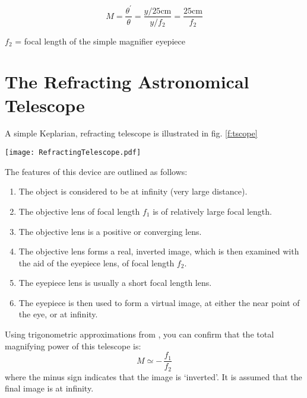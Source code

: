 \begin{equation}\label{e:mag}
	M =\frac{\theta^{\prime}}{\theta}=\frac{y/25\textrm{cm}}{y/f_{2}}=\frac{25\textrm{cm}}{f_{2}}
\end{equation}


$f_2$ = focal length of the simple magnifier eyepiece


\section{The Refracting Astronomical Telescope}
A simple Keplarian, refracting telescope is illustrated in fig. \ref{f:tscope}

\begin{figure*}
  \hfill
  \texttt{[image: RefractingTelescope.pdf]}
  \caption[Keplerian Refracting Telescope]{\textsc{Refracting telescope} with the the object and image projected over each other on the left.  The main lens has a focal length of $f_{1}$ while the eyepiece has a focal length of $f_{2}$}
  \label{f:tscope}
  \forceversofloat
\end{figure*}

The features of this device are outlined as follows:
\begin{enumerate}
	\item The object is considered to be at infinity (very large distance). 
	\item The objective lens of focal length $f_1$ is of relatively large focal length.	
	\item The objective lens is a positive or converging lens.
	\item The objective lens forms a real, inverted image, which is then examined with the aid of the eyepiece lens, of focal length $f_2$. 
	\item The eyepiece lens is usually a short focal length lens.
	\item The eyepiece is then used to form a virtual image, at either the near point of the eye, or at infinity.
\end{enumerate}

Using trigonometric approximations from , you can confirm that the total magnifying power of this telescope is:
\begin{equation}\label{e:tscope}
	M \simeq -\,\frac{f_1}{f_2}
\end{equation}
where the minus sign indicates that the image is `inverted'. It is assumed that the final image is at infinity.

